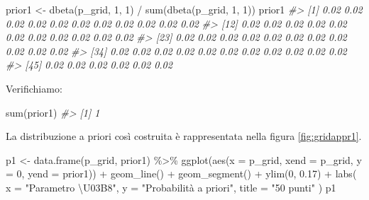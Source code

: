 \documentclass[
]{memoir}
\newenvironment{Shaded}{\begin{snugshade}}{\end{snugshade}}
\newcommand{\AttributeTok}[1]{\textcolor[rgb]{0.77,0.63,0.00}{#1}}
\newcommand{\CommentTok}[1]{\textcolor[rgb]{0.56,0.35,0.01}{\textit{#1}}}
\newcommand{\DecValTok}[1]{\textcolor[rgb]{0.00,0.00,0.81}{#1}}
\newcommand{\FloatTok}[1]{\textcolor[rgb]{0.00,0.00,0.81}{#1}}
\newcommand{\FunctionTok}[1]{\textcolor[rgb]{0.00,0.00,0.00}{#1}}
\newcommand{\NormalTok}[1]{#1}
\newcommand{\OtherTok}[1]{\textcolor[rgb]{0.56,0.35,0.01}{#1}}
\newcommand{\SpecialCharTok}[1]{\textcolor[rgb]{0.00,0.00,0.00}{#1}}
\newcommand{\StringTok}[1]{\textcolor[rgb]{0.31,0.60,0.02}{#1}}
\begin{document}
\begin{Shaded}
\begin{Highlighting}[]
\NormalTok{prior1 }\OtherTok{\textless{}{-}} \FunctionTok{dbeta}\NormalTok{(p\_grid, }\DecValTok{1}\NormalTok{, }\DecValTok{1}\NormalTok{) }\SpecialCharTok{/} \FunctionTok{sum}\NormalTok{(}\FunctionTok{dbeta}\NormalTok{(p\_grid, }\DecValTok{1}\NormalTok{, }\DecValTok{1}\NormalTok{))}
\NormalTok{prior1}
\CommentTok{\#\textgreater{}  [1] 0.02 0.02 0.02 0.02 0.02 0.02 0.02 0.02 0.02 0.02 0.02}
\CommentTok{\#\textgreater{} [12] 0.02 0.02 0.02 0.02 0.02 0.02 0.02 0.02 0.02 0.02 0.02}
\CommentTok{\#\textgreater{} [23] 0.02 0.02 0.02 0.02 0.02 0.02 0.02 0.02 0.02 0.02 0.02}
\CommentTok{\#\textgreater{} [34] 0.02 0.02 0.02 0.02 0.02 0.02 0.02 0.02 0.02 0.02 0.02}
\CommentTok{\#\textgreater{} [45] 0.02 0.02 0.02 0.02 0.02 0.02}
\end{Highlighting}
\end{Shaded}

\noindent
Verifichiamo:

\begin{Shaded}
\begin{Highlighting}[]
\FunctionTok{sum}\NormalTok{(prior1)}
\CommentTok{\#\textgreater{} [1] 1}
\end{Highlighting}
\end{Shaded}

\noindent
La distribuzione a priori così costruita è rappresentata nella figura \ref{fig:gridappr1}.

\begin{Shaded}
\begin{Highlighting}[]
\NormalTok{p1 }\OtherTok{\textless{}{-}} \FunctionTok{data.frame}\NormalTok{(p\_grid, prior1) }\SpecialCharTok{\%\textgreater{}\%}
  \FunctionTok{ggplot}\NormalTok{(}\FunctionTok{aes}\NormalTok{(}\AttributeTok{x =}\NormalTok{ p\_grid, }\AttributeTok{xend =}\NormalTok{ p\_grid, }\AttributeTok{y =} \DecValTok{0}\NormalTok{, }\AttributeTok{yend =}\NormalTok{ prior1)) }\SpecialCharTok{+}
  \FunctionTok{geom\_line}\NormalTok{() }\SpecialCharTok{+}
  \FunctionTok{geom\_segment}\NormalTok{() }\SpecialCharTok{+}
  \FunctionTok{ylim}\NormalTok{(}\DecValTok{0}\NormalTok{, }\FloatTok{0.17}\NormalTok{) }\SpecialCharTok{+}
  \FunctionTok{labs}\NormalTok{(}
    \AttributeTok{x =} \StringTok{"Parametro \textbackslash{}U03B8"}\NormalTok{,}
    \AttributeTok{y =} \StringTok{"Probabilità a priori"}\NormalTok{,}
    \AttributeTok{title =} \StringTok{"50 punti"}
\NormalTok{  )}
\NormalTok{p1}
\end{Highlighting}
\end{Shaded}
\end{document}
